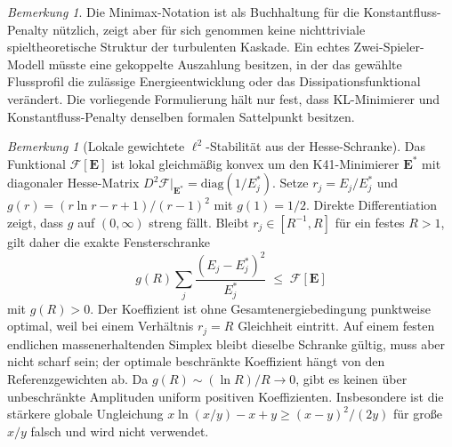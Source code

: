\documentclass[12pt,a4paper]{article}
\theoremstyle{definition}
\theoremstyle{plain}
\theoremstyle{remark}
\newtheorem{remark}[definition]{Bemerkung}
\begin{document}
\begin{remark}
Die Minimax-Notation ist als Buchhaltung für die Konstantfluss-Penalty
nützlich, zeigt aber für sich genommen keine nichttriviale
spieltheoretische Struktur der turbulenten Kaskade. Ein echtes
Zwei-Spieler-Modell müsste eine gekoppelte Auszahlung besitzen, in der das
gewählte Flussprofil die zulässige Energieentwicklung oder das
Dissipationsfunktional verändert. Die vorliegende Formulierung hält nur
fest, dass KL-Minimierer und Konstantfluss-Penalty denselben formalen
Sattelpunkt besitzen.
\end{remark}

\begin{remark}[Lokale gewichtete $\ell^2$-Stabilität aus der Hesse-Schranke]
\label{rem:talagrand}
Das Funktional $\mathcal{F}[\mathbf{E}]$ ist lokal gleichmäßig konvex um
den K41-Minimierer $\mathbf{E}^*$ mit diagonaler Hesse-Matrix
$D^2\mathcal{F}|_{\mathbf{E}^*} = \mathrm{diag}(1/E_j^*)$. Setze
$r_j=E_j/E_j^*$ und
$g(r)=(r\ln r-r+1)/(r-1)^2$ mit $g(1)=1/2$. Direkte Differentiation
zeigt, dass $g$ auf $(0,\infty)$ streng fällt. Bleibt
$r_j\in[R^{-1},R]$ für ein festes $R>1$, gilt daher die exakte
Fensterschranke
\[
  g(R)\sum_j \frac{(E_j - E_j^*)^2}{E_j^*}
  \;\le\; \mathcal{F}[\mathbf{E}]
\]
mit $g(R)>0$. Der Koeffizient ist ohne Gesamtenergiebedingung punktweise
optimal, weil bei einem Verhältnis $r_j=R$ Gleichheit eintritt. Auf einem
festen endlichen massenerhaltenden Simplex bleibt dieselbe Schranke gültig,
muss aber nicht scharf sein; der optimale beschränkte Koeffizient hängt von
den Referenzgewichten ab. Da $g(R)\sim(\ln R)/R\to0$, gibt es keinen über
unbeschränkte Amplituden uniform positiven Koeffizienten. Insbesondere ist
die stärkere globale Ungleichung
$x\ln(x/y)-x+y\ge (x-y)^2/(2y)$ für große $x/y$ falsch und wird nicht
verwendet.
\end{remark}
\end{document}
